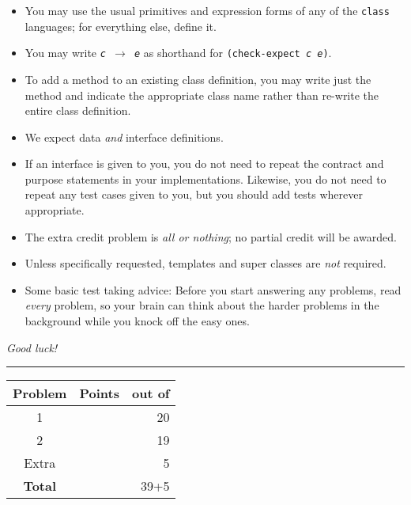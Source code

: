\documentclass[12pt]{article}                   %
\newcommand\code[1]{\texttt{#1}}
\begin{document}
\noindent\begin{minipage}{8cm}\sloppy
\begin{itemize}
\item You may use the usual primitives and expression forms of any of
  the \code{class} languages; for everything else, define it.

\item You may write {\tt {\slshape c} $\rightarrow$ {\slshape e}} as
  shorthand for
  {\tt (check-expect {\slshape c e})}.

\item To add a method to an existing class definition, you
  may write just the method and indicate the appropriate class name
  rather than re-write the entire class definition.

\item We expect data \emph{and} interface definitions.

\item If an interface is given to you, you do not need to repeat the
  contract and purpose statements in your implementations.  Likewise,
  you do not need to repeat any test cases given to you, but you
  should add tests wherever appropriate.


\item The extra credit problem is \emph{all or nothing};  no partial
  credit will be awarded.

\item Unless specifically requested, templates and super classes are
  \emph{not} required.

\item Some basic test taking advice: Before you start answering
any problems, read \emph{every} problem, so your brain can  think
about the harder problems in the background while you knock off the easy ones.
\end{itemize}

\bigskip

\emph{Good luck!}
\end{minipage}\hfil\begin{minipage}[t]{6cm}
\rule{1cm}{0pt}\begin{tabular}{|c|l|@{/}r|}
\hline
{\bf Problem} & Points & out of \\ \hline
1 & & 20\\ \hline
2 & & 19\\ \hline
Extra & & 5 \\ \hline
{\bf Total} & & 39+5 \\ \hline
\end{tabular}
\end{minipage}
\end{document}
